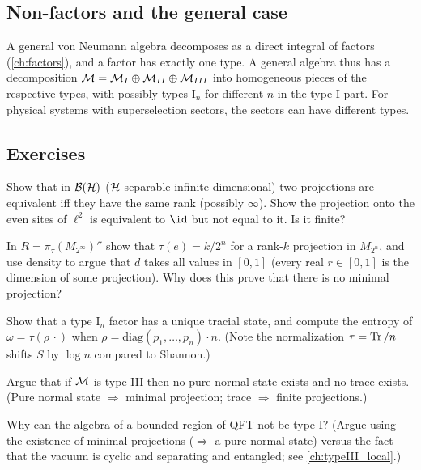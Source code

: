 \subsection{Non-factors and the general case}

A general von Neumann algebra decomposes as a direct integral of factors (\cref{ch:factors}), and a factor has exactly one type. A general algebra thus has a decomposition $\mathcal{M}=\mathcal{M}_I\oplus\mathcal{M}_{II}\oplus\mathcal{M}_{III}$ into homogeneous pieces of the respective types, with possibly types I$_n$ for different $n$ in the type I part. For physical systems with superselection sectors, the sectors can have different types.

\subsection*{Exercises}
\begin{exercise}\label{ex:classification:1}
Show that in $\mathcal{B}(\mathcal{H})$ ($\mathcal{H}$ separable infinite-dimensional) two projections are equivalent iff they have the same rank (possibly $\infty$). Show the projection onto the even sites of $\ell^2$ is equivalent to $\id$ but not equal to it. Is it finite?
\end{exercise}
\begin{exercise}\label{ex:classification:2}
In $R=\pi_\tau(M_{2^\infty})''$ show that $\tau(e)=k/2^n$ for a rank-$k$ projection in $M_{2^n}$, and use density to argue that $d$ takes all values in $[0,1]$ (every real $r\in[0,1]$ is the dimension of some projection). Why does this prove that there is no minimal projection?
\end{exercise}
\begin{exercise}\label{ex:classification:3}
Show that a type I$_n$ factor has a unique tracial state, and compute the entropy of $\omega=\tau(\rho\,\cdot)$ when $\rho=\mathrm{diag}(p_1,\dots,p_n)\cdot n$. (Note the normalization $\tau=\operatorname{Tr}/n$ shifts $S$ by $\log n$ compared to Shannon.)
\end{exercise}
\begin{exercise}\label{ex:classification:4}
Argue that if $\mathcal{M}$ is type III then no pure normal state exists and no trace exists. (Pure normal state $\Rightarrow$ minimal projection; trace $\Rightarrow$ finite projections.)
\end{exercise}
\begin{exercise}\label{ex:classification:5}
Why can the algebra of a bounded region of QFT not be type I? (Argue using the existence of minimal projections ($\Rightarrow$ a pure normal state) versus the fact that the vacuum is cyclic and separating and entangled; see \cref{ch:typeIII_local}.)
\end{exercise}

